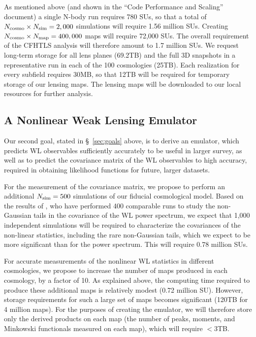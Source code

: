 \documentclass[10pt, preprint]{aastex}
\begin{document}
As mentioned above (and shown in the ``Code Performance and Scaling''
document) a single N-body run requires 780 SUs, so that a total of
$N_{\rm cosmo}\times N_{\rm sim}=2,000$ simulations will require 1.56
million SUs.  Creating $N_{\rm cosmo}\times N_{\rm map}=400,000$ maps
will require 72,000 SUs.  The overall requirement of the CFHTLS
analysis will therefore amount to 1.7 million SUs.  We request
long-term storage for all lens planes (69.2TB) and the full 3D
snapshots in a representative run in each of the 100 cosmologies
(25TB).  Each realization for every subfield requires 30MB, so that
12TB will be required for temporary storage of our lensing maps.  The
lensing maps will be downloaded to our local resources for further
analysis.

\subsection{A Nonlinear Weak Lensing Emulator}

Our second goal, stated in \S~\ref{sec:goals} above, is to derive an
emulator, which predicts WL observables sufficiently accurately to be
useful in larger survey, as well as to predict the covariance matrix
of the WL observables to high accuracy, required in obtaining
likelihood functions for future, larger datasets.  

For the measurement of the covariance matrix, we propose to perform an
additional $N_{\rm sim}=500$ simulations of our fiducial cosmological
model.  Based on the results of \cite{Sato09}, who have performed 400
comparable runs to study the non-Gaussian tails in the covariance of
the WL power spectrum, we expect that 1,000 independent simulations
will be required to characterize the covariances of the non-linear
statistics, including the rare non-Gaussian tails, which we expect to
be more significant than for the power spectrum.  This will require
0.78 million SUs.

For accurate measurements of the nonlinear WL statistics in different
cosmologies, we propose to increase the number of maps produced in
each cosmology, by a factor of 10.  As explained above, the computing
time required to produce these additional maps is relatively modest
(0.72 million SU).  However, storage requirements for such a large set
of maps becomes significant (120TB for 4 million maps).  For the
purposes of creating the emulator, we will therefore store only the
derived products on each map (the number of peaks, moments, and
Minkowski functionals measured on each map), which will require $<3$TB.
\end{document}
